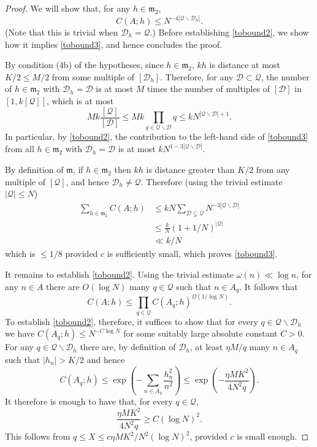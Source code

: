\documentclass[12pt]{amsart}
\newcommand{\abs}[1]{\left\lvert #1\right\rvert}
\newcommand{\brac}[1]{\left( #1\right)}
\begin{document}
\begin{proof}
We will show that, for any $h\in\mathfrak{m}_2$,
\begin{equation}\label{tobound2}
C(A;h)\leq N^{-4\abs{\mathcal{Q}\backslash\mathcal{D}_h}}.
\end{equation}
(Note that this is trivial when $\mathcal{D}_h=\mathcal{Q}$.) Before establishing \eqref{tobound2}, we show how it implies \eqref{tobound3}, and hence concludes the proof.

By condition (4b) of the hypotheses, since $h\in\mathfrak{m}_2$, $kh$ is distance at most $K/2\leq M/2$ from some multiple of $[\mathcal{D}_h]$. Therefore, for any $\mathcal{D}\subset \mathcal{Q}$, the number of $h\in\mathfrak{m}_2$ with $\mathcal{D}_h=\mathcal{D}$ is at most $M$ times the number of multiples of $[\mathcal{D}]$ in $[1,k[\mathcal{Q}]]$, which is at most
\[Mk\frac{[\mathcal{Q}]}{[\mathcal{D}]} \leq Mk\prod_{q\in\mathcal{Q}\backslash\mathcal{D}}q\leq kN^{\abs{\mathcal{Q}\backslash \mathcal{D}}+1}.\]
In particular, by \eqref{tobound2}, the contribution to the left-hand side of \eqref{tobound3} from all $h\in\mathfrak{m}_2$ with $\mathcal{D}_h=\mathcal{D}$ is at most $kN^{1-3\abs{\mathcal{Q}\backslash \mathcal{D}}}$. 

By definition of $\mathfrak{m}$, if $h\in\mathfrak{m}_2$ then $kh$ is distance greater than $K/2$ from any multiple of $[\mathcal{Q}]$, and hence $\mathcal{D}_h\neq \mathcal{Q}$. Therefore (using the trivial estimate $\abs{\mathcal{Q}}\leq N$)
\begin{align*}
\sum_{h\in\mathfrak{m}_2}C(A;h)
&\leq
kN\sum_{\mathcal{D}\subsetneq \mathcal{Q}}N^{-3\abs{\mathcal{Q}\backslash \mathcal{D}}}\\
&\leq \frac{k}{N}(1+1/N)^{\abs{\mathcal{Q}}}\\
&\ll k/N
\end{align*}
which is $\leq 1/8$ provided $c$ is sufficiently small, which proves \eqref{tobound3}.

It remains to establish \eqref{tobound2}. Using the trivial estimate $\omega(n)\ll \log n$, for any $n\in A$ there are $O(\log N)$ many $q\in\mathcal{Q}$ such that $n\in A_q$. It follows that 
 \[C(A;h)\leq \prod_{q\in \mathcal{Q}}C(A_q;h)^{\Omega(1/\log N)}.\]
To establish \eqref{tobound2}, therefore, it suffices to show that for every $q\in\mathcal{Q}\backslash\mathcal{D}_h$ we have $C(A_q;h)\leq N^{-C\log N}$ for some suitably large absolute constant $C>0$. 
 For any $q\in\mathcal{Q}\backslash \mathcal{D}_h$ there are, by definition of $\mathcal{D}_h$, at least $\eta M/q$ many $n\in A_q$ such that $\abs{h_n}>K/2$ and hence
\[C(A_q;h)\leq\exp\brac{-\sum_{n\in A_q}\frac{h_n^2}{n^2}}\leq \exp\brac{-\frac{\eta MK^2}{4N^2q}}.\] 
It therefore is enough to have that, for every $q\in\mathcal{Q}$, 
\[\frac{\eta MK^2}{4N^2q}\geq C(\log N)^2.\]
This follows from $q\leq X\leq c\eta MK^2/N^2(\log N)^2$, provided $c$ is small enough.
\end{proof}
\end{document}

